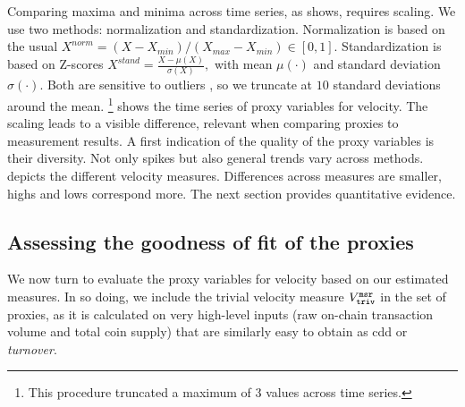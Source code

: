 Comparing maxima and minima across time series, as
 shows, requires scaling.  %
We use two methods: normalization and standardization.  %
Normalization is based on the usual %
$X^{norm} = (X-X_{min})/(X_{max}-X_{min})\in[0, 1]$.  %
Standardization is based on Z-scores
$X^{stand} = \frac{X-\mu(X)}{\sigma(X)},$ with mean $\mu(\cdot)$ and standard
deviation $\sigma(\cdot)$.  Both are sensitive to outliers
\citep[cf.][]{angelov2019empirical}, so we truncate at $10$ standard
deviations around the mean.%
\footnote{This procedure truncated a maximum of 3 values across time
  series.}  %
%
 shows the time series of proxy variables for velocity.  %
The scaling leads to a visible difference, relevant when comparing proxies to
measurement results.  %
A first indication of the quality of the proxy variables is their
diversity.  %
Not only spikes but also general trends vary across methods.  %
%
 depicts the different velocity measures.  %
Differences across measures are smaller, highs and lows correspond more. %
The next section provides quantitative evidence.

\renewcommand{\captionGlo}   {Time series plots for volatility measures with $\perd = \wndwLength = 1 \ttext{ day} $.}%
\renewcommand{\labelGlo}     {\label{fig:globfigEst}}%
\renewcommand{\captionLocL}  {Normalized variables of volatility measurement.}%
\renewcommand{\captionLocR}  {Standardized variables of volatility approximation.}%
\renewcommand{\labelLocL}    {\label{fig:subfigEstNorm}}%
\renewcommand{\labelLocR}    {\label{fig:subfigEstStand}}%
%

\subsection{Assessing the goodness of fit of the proxies}
\label{sec:results:sub:goodness}%
We now turn to evaluate the proxy variables for velocity based on our
estimated measures.  %
In so doing, we include the trivial velocity measure ${V_{\mathtt{triv}}^{\mathtt{msr}}}$ in the set
of proxies, as it is calculated on very high-level inputs (raw on-chain
transaction volume and total coin supply) that are similarly easy to obtain
as \ac{cdd} or \emph{turnover}.%

